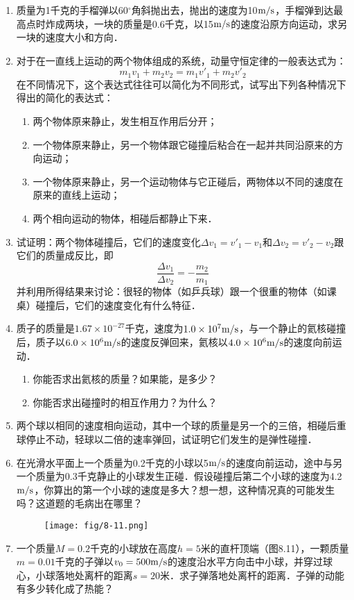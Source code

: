 \begin{enumerate}
    \item 质量为1千克的手榴弹以60$^\circ$角斜抛出去，抛出的速度为10$\text{m}/\text{s}$，手榴弹到达最高点时炸成两块，一块的质量是0.6千克，以15$\text{m}/\text{s}$的速度沿原方向运动，求另一块的速度大小和方向．
    \item 对于在一直线上运动的两个物体组成的系统，动量守恒定律的一般表达式为：
\[m_1v_1+m_2v_2=m_1v'_1+m_2v'_2 \]
    在不同情况下，这个表达式往往可以简化为不同形式，试写出下列各种情况下得出的简化的表达式：
\begin{enumerate}
    \item 两个物体原来静止，发生相互作用后分开；
    \item 一个物体原来静止，另一个物体跟它碰撞后粘合在一起并共同沿原来的方向运动；
    \item 一个物体原来静止，另一个运动物体与它正碰后，两物体以不同的速度在原来的直线上运动；
    \item 两个相向运动的物体，相碰后都静止下来．
\end{enumerate}
\item 试证明：两个物体碰撞后，它们的速度变化$\Delta v_1=v'_1-v_1$和$\Delta v_2=v'_2-v_2$跟它们的质量成反比，即
\[\frac{\Delta v_1}{\Delta v_2}=-\frac{m_2}{m_1}\]
并利用所得结果来讨论：很轻的物体（如乒兵球）跟一个很重的物体（如课桌）碰撞后，它们的速度变化有什么特征．
\item 质子的质量是$1.67\times 10^{-27}$千克，速度为$1.0\times 10^7\text{m}/\text{s}$，与一个静止的氦核碰撞后，质子以$6.0\times 10^6\text{m}/\text{s}$的速度反弹回来，氦核以$4.0\times 10^6\text{m}/\text{s}$的速度向前运动．
   \begin{enumerate}
       \item 你能否求出氦核的质量？如果能，是多少？
       \item 你能否求出碰撞时的相互作用力？为什么？
   \end{enumerate}
   \item 两个球以相同的速度相向运动，其中一个球的质量是另一个的三倍，相碰后重球停止不动，轻球以二倍的速率弹回，试证明它们发生的是弹性碰撞．
   \item 在光滑水平面上一个质量为0.2千克的小球以5$\text{m}/\text{s}$的速度向前运动，途中与另一个质量为0.3千克静止的小球发生正碰．假设碰撞后第二个小球的速度为4.2$\text{m}/\text{s}$，你算出的第一个小球的速度是多大？想一想，这种情况真的可能发生吗？这道题的毛病出在哪里？
\begin{figure}[htp]\centering
\texttt{[image: fig/8-11.png]}
\caption{}
\end{figure}
   \item 一个质量$M=0.2$千克的小球放在高度$h=5$米的直杆顶端（图8.11），一颗质量$m=0.01$千克的子弹以$v_0=500\text{m}/\text{s}$的速度沿水平方向击中小球，并穿过球心，小球落地处离杆的距离$s=20$米．求子弹落地处离杆的距离．子弹的动能有多少转化成了热能？

\end{enumerate}

